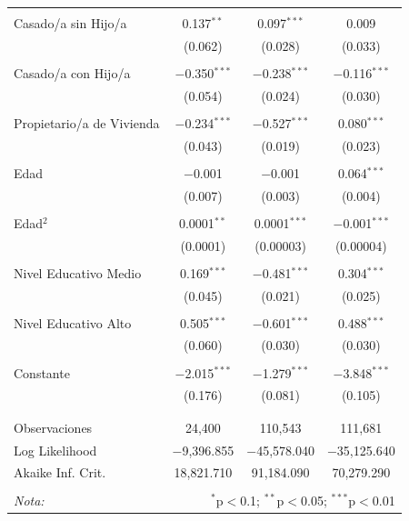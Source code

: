 \documentclass[12pt,a4paper]{article}
\begin{document}
\begin{table}[!htbp]
\begin{tabular}{@{\extracolsep{5pt}}lccc}
  & & & \\ 
 Casado/a sin Hijo/a & 0.137$^{**}$ & 0.097$^{***}$ & 0.009 \\ 
  & (0.062) & (0.028) & (0.033) \\ 
  & & & \\ 
 Casado/a con Hijo/a & $-$0.350$^{***}$ & $-$0.238$^{***}$ & $-$0.116$^{***}$ \\ 
  & (0.054) & (0.024) & (0.030) \\ 
  & & & \\ 
 Propietario/a de Vivienda & $-$0.234$^{***}$ & $-$0.527$^{***}$ & 0.080$^{***}$ \\ 
  & (0.043) & (0.019) & (0.023) \\ 
  & & & \\ 
 Edad & $-$0.001 & $-$0.001 & 0.064$^{***}$ \\ 
  & (0.007) & (0.003) & (0.004) \\ 
  & & & \\ 
 Edad$^2$ & 0.0001$^{**}$ & 0.0001$^{***}$ & $-$0.001$^{***}$ \\ 
  & (0.0001) & (0.00003) & (0.00004) \\ 
  & & & \\ 
 Nivel Educativo Medio & 0.169$^{***}$ & $-$0.481$^{***}$ & 0.304$^{***}$ \\ 
  & (0.045) & (0.021) & (0.025) \\ 
  & & & \\ 
 Nivel Educativo Alto & 0.505$^{***}$ & $-$0.601$^{***}$ & 0.488$^{***}$ \\ 
  & (0.060) & (0.030) & (0.030) \\ 
  & & & \\ 
 Constante & $-$2.015$^{***}$ & $-$1.279$^{***}$ & $-$3.848$^{***}$ \\ 
  & (0.176) & (0.081) & (0.105) \\ 
  & & & \\ 
\hline \\[-1.8ex] 
Observaciones & 24,400 & 110,543 & 111,681 \\ 
Log Likelihood & $-$9,396.855 & $-$45,578.040 & $-$35,125.640 \\ 
Akaike Inf. Crit. & 18,821.710 & 91,184.090 & 70,279.290 \\ 
\hline 
\hline \\[-1.8ex] 
\textit{Nota:}  & \multicolumn{3}{r}{$^{*}$p$<$0.1; $^{**}$p$<$0.05; $^{***}$p$<$0.01} \\ 
\end{tabular} 
\end{table} 
\end{document}
